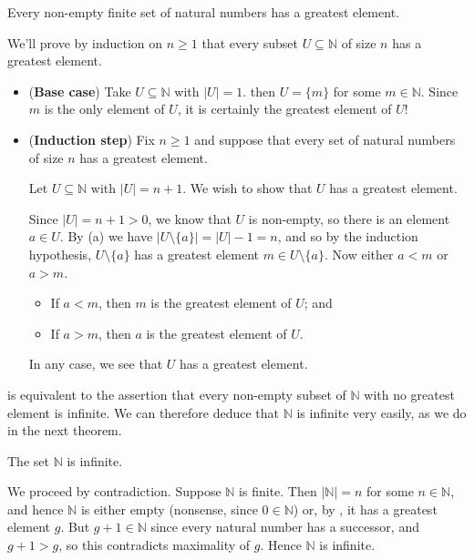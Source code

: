 \begin{lemma}
\label{lemFinSetGreatestElement}
Every non-empty finite set of natural numbers has a greatest element.
\end{lemma}
\begin{cproof}
We'll prove by induction on $n \ge 1$ that every subset $U \subseteq \mathbb{N}$ of size $n$ has a greatest element.
\begin{itemize}
\item (\textbf{Base case}) Take $U \subseteq \mathbb{N}$ with $|U|=1$. then $U = \{ m \}$ for some $m \in \mathbb{N}$. Since $m$ is the only element of $U$, it is certainly the greatest element of $U$!

\item (\textbf{Induction step}) Fix $n \ge 1$ and suppose that every set of natural numbers of size $n$ has a greatest element.

Let $U \subseteq \mathbb{N}$ with $|U| = n+1$. We wish to show that $U$ has a greatest element.

Since $|U| = n+1 > 0$, we know that $U$ is non-empty, so there is an element $a \in U$. By (a) we have $|U \setminus \{ a \}| = |U| - 1 = n$, and so by the induction hypothesis, $U \setminus \{ a \}$ has a greatest element $m \in U \setminus \{ a \}$. Now either $a < m$ or $a > m$.
\begin{itemize}
\item If $a < m$, then $m$ is the greatest element of $U$; and
\item If $a > m$, then $a$ is the greatest element of $U$.
\end{itemize}
In any case, we see that $U$ has a greatest element.
\end{itemize}
\end{cproof}

 is equivalent to the assertion that every non-empty subset of $\mathbb{N}$ with no greatest element is infinite. We can therefore deduce that $\mathbb{N}$ is infinite very easily, as we do in the next theorem.

\begin{theorem}
\label{thmNIsInfinite}
The set $\mathbb{N}$ is infinite.
\end{theorem}

\begin{cproof}
We proceed by contradiction. Suppose $\mathbb{N}$ is finite. Then $|\mathbb{N}| = n$ for some $n \in \mathbb{N}$, and hence $\mathbb{N}$ is either empty (nonsense, since $0 \in \mathbb{N}$) or, by , it has a greatest element $g$. But $g+1 \in \mathbb{N}$ since every natural number has a successor, and $g+1 > g$, so this contradicts maximality of $g$. Hence $\mathbb{N}$ is infinite.
\end{cproof}